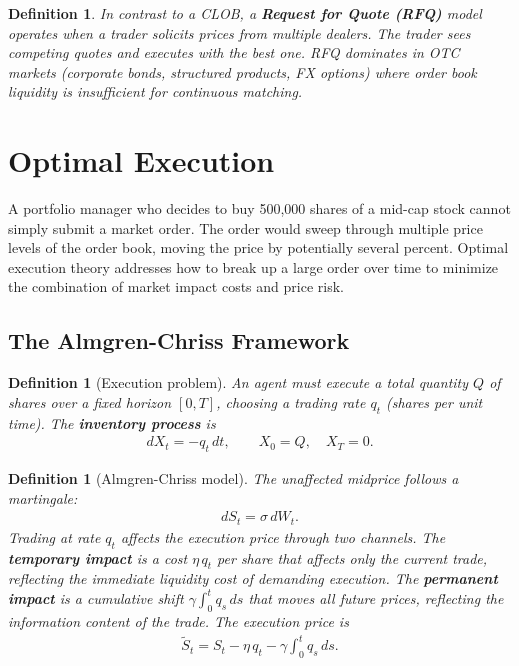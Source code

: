 \documentclass{report}
\theoremstyle{spacedplain}
\theoremstyle{spaceddefinition}
\newtheorem{definition}[theorem]{Definition}
\theoremstyle{spacedremark}
\begin{document}
\begin{definition}
In contrast to a CLOB, a \textbf{Request for Quote (RFQ)} model operates when a trader solicits prices from multiple dealers. The trader sees competing quotes and executes with the best one. RFQ dominates in OTC markets (corporate bonds, structured products, FX options) where order book liquidity is insufficient for continuous matching.
\end{definition}


\section{Optimal Execution}

A portfolio manager who decides to buy 500,000 shares of a mid-cap stock cannot simply submit a market order. The order would sweep through multiple price levels of the order book, moving the price by potentially several percent. Optimal execution theory addresses how to break up a large order over time to minimize the combination of market impact costs and price risk.

\subsection{The Almgren-Chriss Framework}

\begin{definition}[Execution problem]
An agent must execute a total quantity $Q$ of shares over a fixed horizon $[0,T]$, choosing a trading rate $q_t$ (shares per unit time). The \textbf{inventory process} is
\begin{align}
    dX_t = -q_t\,dt, \qquad X_0 = Q, \quad X_T = 0.
\end{align}
\end{definition}

\begin{definition}[Almgren-Chriss model]
The unaffected midprice follows a martingale:
\begin{align}
    dS_t = \sigma\,dW_t.
\end{align}
Trading at rate $q_t$ affects the execution price through two channels. The \textbf{temporary impact} is a cost $\eta\,q_t$ per share that affects only the current trade, reflecting the immediate liquidity cost of demanding execution. The \textbf{permanent impact} is a cumulative shift $\gamma\int_0^t q_s\,ds$ that moves all future prices, reflecting the information content of the trade. The execution price is 
\begin{align}
    \widetilde{S}_t = S_t - \eta\,q_t - \gamma\int_0^t q_s\,ds.
\end{align}
\end{definition}
\end{document}
